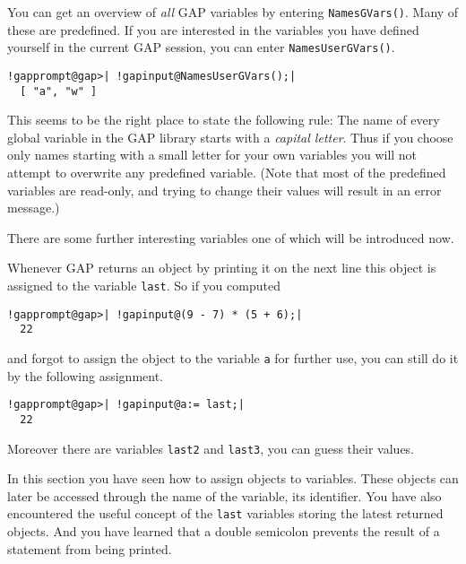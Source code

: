 \documentclass[a4paper,11pt]{report}
\begin{document}
{{ You can get an overview of \emph{all} \textsf{GAP} variables by entering \texttt{NamesGVars()}. Many of these are predefined. If you are interested in the variables you
have defined yourself in the current \textsf{GAP} session, you can enter \texttt{NamesUserGVars()}. 

 
\begin{Verbatim}[commandchars=!@|,fontsize=\small,frame=single,label=Example]
  !gapprompt@gap>| !gapinput@NamesUserGVars();|
  [ "a", "w" ]
\end{Verbatim}
 

 This seems to be the right place to state the following rule: The name of
every global variable in the \textsf{GAP} library starts with a \emph{capital letter}. Thus if you choose only names starting with a small letter for your own
variables you will not attempt to overwrite any predefined variable. (Note
that most of the predefined variables are read-only, and trying to change
their values will result in an error message.) 

 There are some further interesting variables one of which will be introduced
now. 

    Whenever \textsf{GAP} returns an object by printing it on the next line this object is assigned to
the variable \texttt{last}. So if you computed 

 
\begin{Verbatim}[commandchars=!@|,fontsize=\small,frame=single,label=Example]
  !gapprompt@gap>| !gapinput@(9 - 7) * (5 + 6);|
  22
\end{Verbatim}
 

 and forgot to assign the object to the variable \texttt{a} for further use, you can still do it by the following assignment. 

 
\begin{Verbatim}[commandchars=!@|,fontsize=\small,frame=single,label=Example]
  !gapprompt@gap>| !gapinput@a:= last;|
  22
\end{Verbatim}
 

 Moreover there are variables \texttt{last2} and \texttt{last3}, you can guess their values. 

  In this section you have seen how to assign objects to variables. These
objects can later be accessed through the name of the variable, its
identifier. You have also encountered the useful concept of the \texttt{last} variables storing the latest returned objects. And you have learned that a
double semicolon prevents the result of a statement from being printed. }

}
\end{document}
